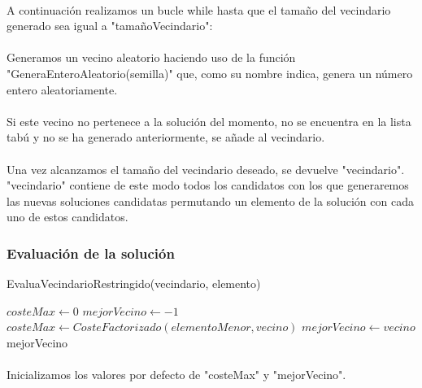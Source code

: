 \documentclass{article}
\begin{document}
	\paragraph{}A continuación realizamos un bucle while hasta que el tamaño del vecindario generado sea igual a "tamañoVecindario":
	
	\paragraph{}Generamos un vecino aleatorio haciendo uso de la función "GeneraEnteroAleatorio(semilla)" que, como su nombre indica, genera un número entero aleatoriamente.
	
	\paragraph{}Si este vecino no pertenece a la solución del momento, no se encuentra en la lista tabú y no se ha generado anteriormente, se añade al vecindario.
	
	\paragraph{}Una vez alcanzamos el tamaño del vecindario deseado, se devuelve "vecindario". "vecindario" contiene de este modo todos los candidatos con los que generaremos las nuevas soluciones candidatas permutando un elemento de la solución con cada uno de estos candidatos.
	
	\subsubsection{Evaluación de la solución}
	
	\begin{algorithm}[H]
		\caption{EvaluaVecindarioRestringido(vecindario, elemento)}
		
		\begin{algorithmic}
			\STATE $costeMax \leftarrow 0$
			\STATE $mejorVecino \leftarrow -1$	
			\STATE $costeMax \leftarrow CosteFactorizado(elementoMenor, vecino)$
			\STATE $mejorVecino \leftarrow vecino$
			\ENDIF
			\ENDFOR
			\RETURN mejorVecino
		\end{algorithmic}
	\end{algorithm}
	
	\paragraph{}Inicializamos los valores por defecto de "costeMax" y "mejorVecino".
	
\end{document}
